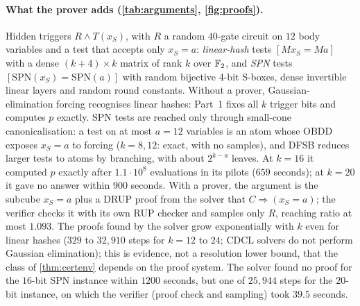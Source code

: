 \paragraph{What the prover adds (\cref{tab:arguments}, \cref{fig:proofs}).}
Hidden triggers $R\wedge T(x_S)$, with $R$ a random $40$-gate circuit on $12$ body
variables and a test that accepts only $x_S=a$: \emph{linear-hash} tests $[Mx_S=Ma]$
with a dense $(k+4)\times k$ matrix of rank $k$ over $\mathbb{F}_2$, and \emph{SPN} tests
$[\mathrm{SPN}(x_S)=\mathrm{SPN}(a)]$ with random bijective 4-bit S-boxes, dense
invertible linear layers and random round constants. Without a prover,
Gaussian-elimination forcing recognises linear hashes: Part~1 fixes all $k$ trigger
bits and computes $p$ exactly. SPN tests are reached only through small-cone
canonicalisation: a test on at most $a=12$ variables is an atom whose OBDD exposes
$x_S=a$ to forcing ($k=8,12$: exact, with no samples), and DFSB reduces larger tests to
atoms by branching, with about $2^{k-a}$ leaves. At $k=16$ it computed $p$ exactly
after $1.1\cdot10^8$ evaluations in its pilots ($659$ seconds); at $k=20$ it gave no
answer within $900$ seconds. With a prover, the argument is the subcube $x_S=a$ plus a
DRUP proof from the solver that $C\Rightarrow(x_S=a)$; the verifier checks it with its
own RUP checker and samples only $R$, reaching ratio at most $1.093$. The proofs found by
the solver grow exponentially with $k$ even for linear hashes ($329$ to $32{,}910$ steps
for $k=12$ to $24$; CDCL solvers do not perform Gaussian elimination); this is evidence,
not a resolution lower bound, that the class of \cref{thm:certenv} depends on the proof
system. The solver found no proof for the $16$-bit SPN instance within $1200$ seconds,
but one of $25{,}944$ steps for the $20$-bit instance, on which the verifier (proof check
and sampling) took $39.5$ seconds.

\begin{table}[ht]
\centering\scriptsize
{}
\caption{Hidden triggers with and without a prover (\texttt{exp\_arguments.py}).
Part~1 ratio is that of the DFSB interval; Part~2 ratio
is that of the verifier's interval after checking the proof; ``check'' is the
verifier's time (proof check and sampling). For the $16$-bit SPN instance the solver found no proof within
$1200$ seconds, and Part~1 was exact there.}
\label{tab:arguments}
\end{table}

